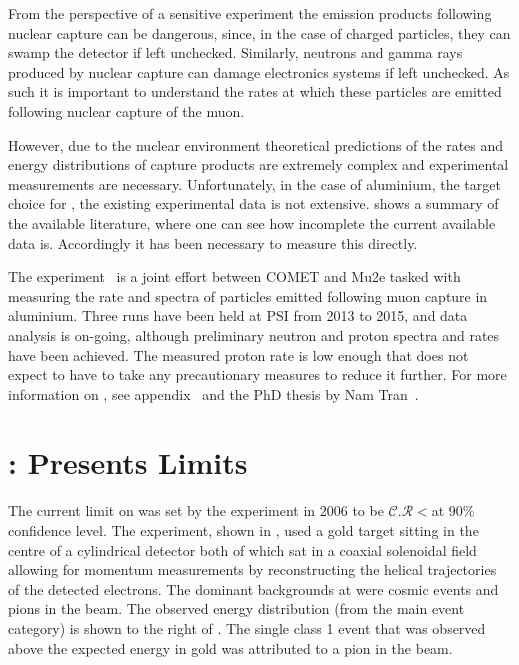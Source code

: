 From the perspective of a sensitive \mueconv experiment the emission products following nuclear capture can be dangerous, since, in the case of charged particles, they can swamp the detector if left unchecked.
Similarly, neutrons and gamma rays produced by nuclear capture can damage electronics systems if left unchecked.
As such it is important to understand the rates at which these particles are emitted following nuclear capture of the muon.

However, due to the nuclear environment theoretical predictions of the rates and energy distributions of capture products are extremely complex and experimental measurements are necessary.
Unfortunately, in the case of aluminium, the target choice for \COMET, the existing experimental data is not extensive.
 shows a summary of the available literature, where one can see how incomplete the current available data is.
Accordingly it has been necessary to measure this directly.

The \alcap experiment~\cite{AlcapProposal2012} is a joint effort between COMET and Mu2e tasked with measuring the rate and spectra of particles emitted following muon capture in aluminium.
Three runs have been held at \ac{PSI} from 2013 to 2015, and data analysis is on-going, although preliminary neutron and proton spectra and rates have been achieved.
The measured proton rate is low enough that \COMET does not expect to have to take any precautionary measures to reduce it further.
For more information on \alcap, see appendix~ and the PhD thesis by Nam Tran~\cite{NamThesis}.

\section{\sindrumII: Presents Limits}
\FigMuecSindrumII
The current limit on \mueconv was set by the \sindrumII experiment in 2006 to be $\mathcal{C.R}<$\senseSindrum at 90\% confidence level.
The experiment, shown in , used a gold target sitting in the centre of a cylindrical detector both of which sat in a coaxial solenoidal field allowing for momentum measurements by reconstructing the helical trajectories of the detected electrons.
The dominant backgrounds at \sindrumII were cosmic events and pions in the beam.  
The observed energy distribution (from the main event category) is shown to the right of .  
The single class 1 event that was observed above the expected \mueconv energy in gold was attributed to a pion in the beam.

